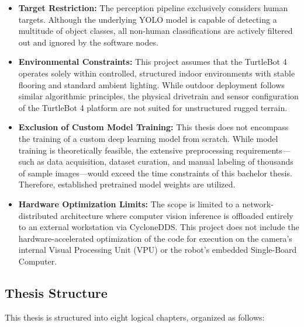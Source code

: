 \begin{itemize}
	\item \textbf{Target Restriction:} The perception pipeline exclusively considers human targets. Although the underlying YOLO model is capable of detecting a multitude of object classes, all non-human classifications are actively filtered out and ignored by the software nodes.
	\item \textbf{Environmental Constraints:} This project assumes that the TurtleBot 4 operates solely within controlled, structured indoor environments with stable flooring and standard ambient lighting. While outdoor deployment follows similar algorithmic principles, the physical drivetrain and sensor configuration of the TurtleBot 4 platform are not suited for unstructured rugged terrain.
	\item \textbf{Exclusion of Custom Model Training:} This thesis does not encompass the training of a custom deep learning model from scratch. While model training is theoretically feasible, the extensive preprocessing requirements—such as data acquisition, dataset curation, and manual labeling of thousands of sample images—would exceed the time constraints of this bachelor thesis. Therefore, established pretrained model weights are utilized.
	\item \textbf{Hardware Optimization Limits:} The scope is limited to a network-distributed architecture where computer vision inference is offloaded entirely to an external workstation via CycloneDDS. This project does not include the hardware-accelerated optimization of the code for execution on the camera's internal Visual Processing Unit (VPU) or the robot's embedded Single-Board Computer.
\end{itemize}
 

\subsection{Thesis Structure} %
This thesis is structured into eight logical chapters, organized as follows:


